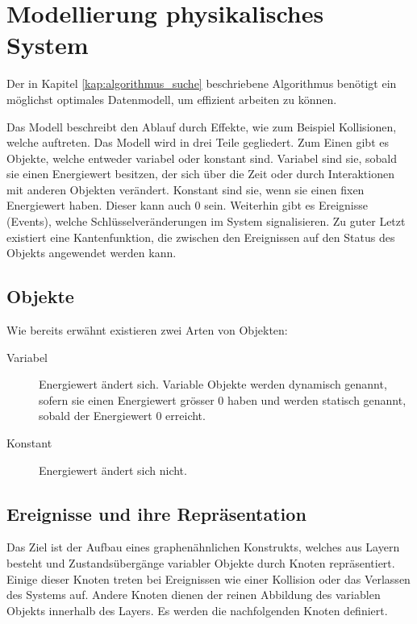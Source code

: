 \section{Modellierung physikalisches System}
Der in Kapitel \ref{kap:algorithmus_suche} beschriebene Algorithmus benötigt ein möglichst optimales Datenmodell,
um effizient arbeiten zu können.

Das Modell beschreibt den Ablauf durch Effekte, wie zum Beispiel Kollisionen, welche auftreten.
Das Modell wird in drei Teile gegliedert.
Zum Einen gibt es Objekte, welche entweder variabel oder konstant sind.
Variabel sind sie, sobald sie einen Energiewert besitzen, der sich über die Zeit oder durch
Interaktionen mit anderen Objekten verändert.
Konstant sind sie, wenn sie einen fixen Energiewert haben. Dieser kann auch 0 sein.
Weiterhin gibt es Ereignisse (Events), welche Schlüsselveränderungen im System signalisieren.
Zu guter Letzt existiert eine Kantenfunktion, die zwischen den Ereignissen auf den Status des Objekts angewendet werden kann.

\subsection{Objekte}
Wie bereits erwähnt existieren zwei Arten von Objekten:
\begin{description}
    \item[Variabel] Energiewert ändert sich. Variable Objekte werden dynamisch genannt, sofern sie einen Energiewert grösser
    0 haben und werden statisch genannt, sobald der Energiewert 0 erreicht.
    \item[Konstant] Energiewert ändert sich nicht.
\end{description}

\newpage
\subsection{Ereignisse und ihre Repräsentation}
Das Ziel ist der Aufbau eines graphenähnlichen Konstrukts, welches aus Layern besteht und Zustandsübergänge variabler
Objekte durch Knoten repräsentiert. Einige dieser Knoten treten bei Ereignissen wie einer Kollision oder das Verlassen des Systems
auf. Andere Knoten dienen der reinen Abbildung des variablen Objekts innerhalb des Layers. Es werden die nachfolgenden
Knoten definiert.\\

